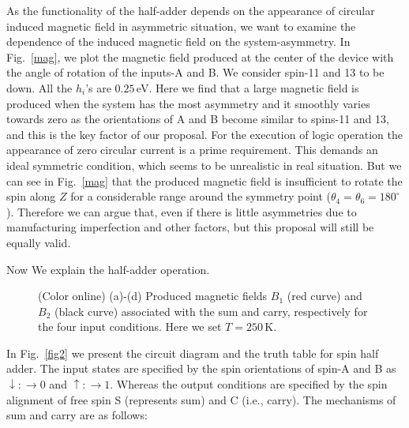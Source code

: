 \documentclass[prb,aps,twocolumn,amsmath,amssymb,floatfix,superscriptaddress]{revtex4}
\begin{document}
As the functionality of the half-adder depends on the appearance of
circular induced magnetic field in asymmetric situation, we want to examine the dependence of the
induced magnetic field on the system-asymmetry. In Fig.~\ref{mag}, we plot the magnetic field
produced at the center
of the device with the angle of rotation of the inputs-A and B. We consider spin-11 and 13
to be down. All the $h_i$'s are $0.25\,$eV. Here we find that a large magnetic field is produced
when the system has the most asymmetry and it smoothly varies towards zero as the
orientations of A and B become similar to spins-11 and 13, and this is the key factor of our proposal.
For the execution of logic operation the appearance of zero circular current is a prime requirement.
This demands an ideal symmetric condition, which seems to be unrealistic in
real situation. But we can see in Fig.~\ref{mag} that the produced magnetic field is insufficient to
rotate the spin along $Z$ for a considerable range around the symmetry point
($\theta_4 = \theta_6 = 180^{\circ}$). Therefore we can argue that, even if there is little
asymmetries due to manufacturing imperfection and other factors, but this proposal will
still be equally valid.

Now We explain the half-adder operation.
\begin{figure}[ht]
{\centering{}\par}
\caption{(Color online) (a)-(d) Produced magnetic fields $B_1$ (red curve) and
$B_2$ (black curve) associated with the sum and carry, respectively for the four input conditions.
Here we set $T = 250\,$K.}
\label{fig3}
\end{figure}
In Fig.~\ref{fig2} we present the circuit diagram and the truth table for spin half adder.
The input states are specified by the spin orientations of
spin-A and B as $\downarrow : \rightarrow 0$ and $\uparrow : \rightarrow 1$.
Whereas the output conditions are specified by the spin alignment of free
spin S (represents sum) and C (i.e., carry). The mechanisms
of sum and carry are as follows:
\end{document}
